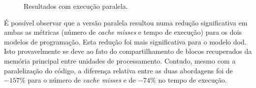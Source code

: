 \begin{figure}[h!t]
    \centering
    \caption[Resultados estudo de caso 2 com execução paralela]{Resultados com execução paralela.}
    \label{fig:problem2resultParallel}
\end{figure}

É possível observar que a versão paralela resultou numa redução significativa em ambas as métricas (número de  \textit{cache misses} e tempo de execução) para os dois modelos de programação. Esta redução foi mais significativa para o modelo \ac{dod}. Isto provavelmente se deve ao fato do compartilhamento de blocos recuperados da memória principal entre unidades de processamento. Contudo, mesmo com a paralelização do código, a diferença relativa entre as duas abordagens foi de $-157\%$ para o número de  \textit{cache misses} e de $-74\%$ no tempo de execução.





